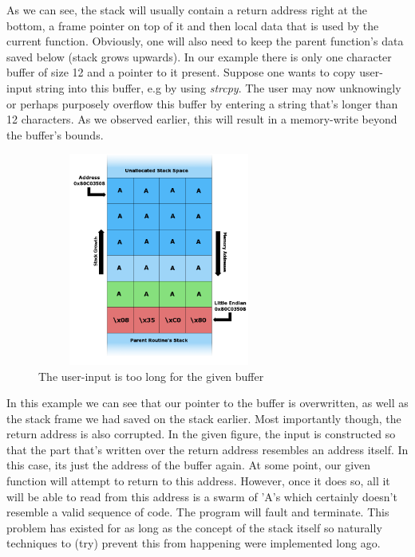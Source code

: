 \documentclass[10pt,twocolumn,a4paper]{article}
\begin{document}
As we can see, the stack will usually contain a return address right at the bottom, a frame pointer on top of it and then local data that is used by the current function.
Obviously, one will also need to keep the parent function's data saved below (stack grows upwards).
In our example there is only one character buffer of size 12 and a pointer to it present.
Suppose one wants to copy user-input string into this buffer, e.g by using \emph{strcpy}.
The user may now unknowingly or perhaps purposely overflow this buffer by entering a string that's longer than 12 characters.
As we observed earlier, this will result in a memory-write beyond the buffer's bounds. 
\begin{figure}[h]
	\begin{center}
		\includegraphics[height=7cm,width=8cm]{fig/Stack_Overflow2}
		\caption{The user-input is too long for the given buffer}
	\end{center}
\end{figure}
\newline 
In this example we can see that our pointer to the buffer is overwritten, as well as the stack frame we had saved on the stack earlier.
Most importantly though, the return address is also corrupted.
In the given figure, the input is constructed so that the part that's written over the return address resembles an address itself.
In this case, its just the address of the buffer again.
At some point, our given function will attempt to return to this address.
However, once it does so, all it will be able to read from this address is a swarm of  'A's which certainly doesn't resemble a valid sequence of code.
The program will fault and terminate.
This problem has existed for as long as the concept of the stack itself so naturally techniques to (try) prevent this from happening were implemented long ago.
\end{document}
